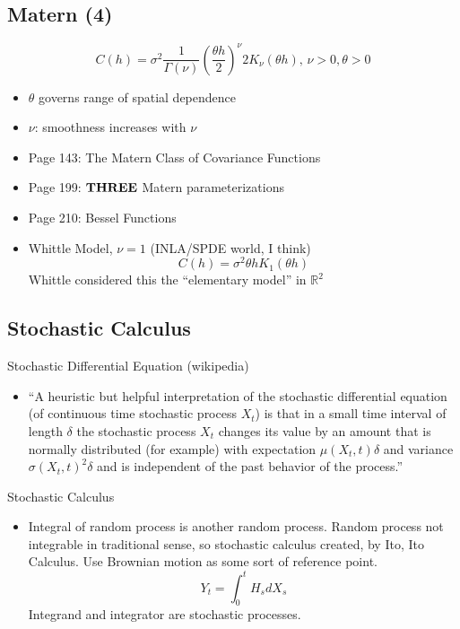 \documentclass{article}
\begin{document}
\subsection*{Matern (4)}
\citep{Schabenberger2004}
$$ C(h) = \sigma^{2}\frac{1}{\Gamma(\nu)}\left(\frac{\theta h}{2}\right)^{\nu}2K_{\nu}(\theta h) \text{,   } \nu >0, \theta > 0 $$
\begin{itemize}
\item $\theta$ governs range of spatial dependence
\item $\nu$: smoothness increases with $\nu$
\item Page 143: The Matern Class of Covariance Functions
\item Page 199: ${\bf THREE}$ Matern parameterizations
\item Page 210: Bessel Functions
\item Whittle Model, $\nu = 1$ (INLA/SPDE world, I think)
$$ C(h) = \sigma^{2}\theta h K_{1}(\theta h) $$
Whittle considered this the ``elementary model'' in $\mathbb{R}^{2}$
\end{itemize}

\subsection*{Stochastic Calculus}

Stochastic Differential Equation (wikipedia)
\begin{itemize}
\item ``A heuristic but helpful interpretation of the stochastic differential equation (of continuous time stochastic process $X_{t}$) is that in a small time interval of length $\delta$ the stochastic process $X_{t}$ changes its value by an amount that is normally distributed (for example) with expectation $\mu(X_{t},t)\delta$ and variance $\sigma(X_{t}, t)^{2}\delta$ and is independent of the past behavior of the process.''
\end{itemize}
Stochastic Calculus \citep{Mao2007}
\begin{itemize}
\item Integral of random process is another random process. Random process not integrable in traditional sense, so stochastic calculus created, by Ito, Ito Calculus. Use Brownian motion as some sort of reference point.
$$ Y_{t} = \int_{0}^{t} H_{s} dX_{s} $$
Integrand and integrator are stochastic processes.
\end{itemize}
\end{document}
